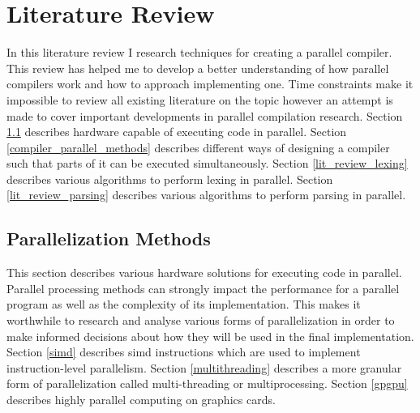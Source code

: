 \chapter{Literature Review} \label{litreview}

In this literature review I research techniques for creating a parallel
compiler. This review has helped me to develop a better understanding of how
parallel compilers work and how to approach implementing one. Time constraints
make it impossible to review all existing literature on the topic however
an attempt is made to cover important developments in parallel compilation
research.
\newline \newline
Section \ref{parallelisation_methods} describes hardware capable of executing
code in parallel.
\newline \newline
Section \ref{compiler_parallel_methods} describes different ways of designing a
compiler such that parts of it can be executed simultaneously.
\newline \newline
Section \ref{lit_review_lexing} describes various algorithms to perform lexing
in parallel.
\newline \newline
Section \ref{lit_review_parsing} describes various algorithms to perform parsing
in parallel.
\newline \newline

\section{Parallelization Methods} \label{parallelisation_methods}
This section describes various hardware solutions for executing code in
parallel. Parallel processing methods can strongly impact the performance
for a parallel program as well as the complexity of its implementation. This
makes it worthwhile to research and analyse various forms of parallelization
in order to make informed decisions about how they will be used in the final
implementation.
\newline \newline
Section \ref{simd} describes \gls{simd} instructions which are used to implement
instruction-level parallelism.
\newline \newline
Section \ref{multithreading} describes a more granular form of parallelization
called multi-threading or multiprocessing.
\newline \newline
Section \ref{gpgpu} describes highly parallel computing on graphics cards.

